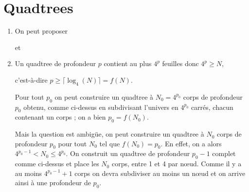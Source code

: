 \section{Quadtrees}
\begin{Exercise}[title=Propriétés des quadtrees]
\renewcommand{\labelenumi}{\alph{enumi})}
\begin{enumerate}
    \itemsep6mm 
    \item On peut proposer
    
    \begin{center}
        \hskip 5mm et \hskip 5mm
    \end{center}
    \item Un quadtree de profondeur $p$ contient au plus $4^p$ feuilles donc $4^p \ge N$, 
    
    c'est-à-dire $p \ge \lceil\log_4(N)\rceil=f(N)$. 

    Pour tout $p_0$ on peut construire un quadtree à $N_0=4^{p_0}$ corps de profondeur $p_0$ obtenu, comme ci-dessus en subdivisant l'univers en $4^{p_0}$ carrés, chacun contenant un corps ; on a bien $p_0=f(N_0)$.
    
    Mais la question est ambigüe, on peut construire un quadtree à $N_0$ corps de profondeur $p_0$ pour tout $N_0$ tel que $f(N_0) = p_0$. En effet, on a alors $4^{p_0-1}< N_0 \le 4^{p_0}$.
    On construit un quadtree de profondeur $p_0-1$ complet comme ci-dessus et place les $N_0$ corps, entre 1 et 4 par nœud. Comme il y a au moins $4^{p_0-1}+1$ corps on devra subdiviser au moins un nœud et on arrive ainsi à une profondeur de $p_0$.
    

\end{enumerate}
\end{Exercise}
